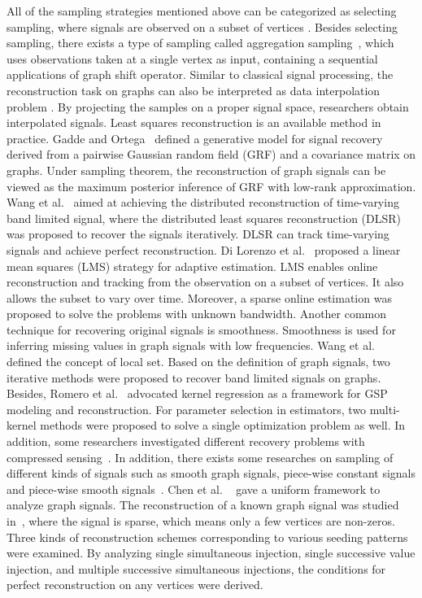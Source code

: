 All of the sampling strategies mentioned above can be categorized as selecting sampling, where signals are observed on a subset of vertices . Besides selecting sampling, there exists a type of sampling called aggregation sampling~, which uses observations taken at a single vertex as input, containing a sequential applications of graph shift operator.
Similar to classical signal processing, the reconstruction task on graphs can also be interpreted as data interpolation problem . By projecting the samples on a proper signal space, researchers obtain interpolated signals. Least squares reconstruction is an available method in practice. Gadde and Ortega~ defined a generative model for signal recovery derived from a pairwise Gaussian random field (GRF) and a covariance matrix on graphs. Under sampling theorem, the reconstruction of graph signals can be viewed as the maximum posterior inference of GRF with low-rank approximation. Wang et al.~ aimed at achieving the distributed reconstruction of time-varying band limited signal, where the distributed least squares reconstruction (DLSR) was proposed to recover the signals iteratively. DLSR can track time-varying signals and achieve perfect reconstruction. Di Lorenzo et al.~ proposed a linear mean squares (LMS) strategy for adaptive estimation. LMS enables online reconstruction and tracking from the observation on a subset of vertices. It also allows the subset to vary over time. Moreover, a sparse online estimation was proposed to solve the problems with unknown bandwidth.
Another common technique for recovering original signals is smoothness. Smoothness is used for inferring missing values in graph signals with low frequencies. Wang et al.~ defined the concept of local set. Based on the definition of graph signals, two iterative methods were proposed to recover band limited signals on graphs. Besides, Romero et al.~ advocated kernel regression as a framework for GSP modeling and reconstruction. For parameter selection in estimators, two multi-kernel methods were proposed to solve a single optimization problem as well. In addition, some researchers investigated different recovery problems with compressed sensing~.
In addition, there exists some researches on sampling of different kinds of signals such as smooth graph signals, piece-wise constant signals and piece-wise smooth signals~. Chen et al. ~ gave a uniform framework to analyze graph signals. The reconstruction of a known graph signal was studied in~, where the signal is sparse, which means only a few vertices are non-zeros. Three kinds of reconstruction schemes corresponding to various seeding patterns were examined. By analyzing single simultaneous injection, single successive value injection, and multiple successive simultaneous injections, the conditions for perfect reconstruction on any vertices were derived.

